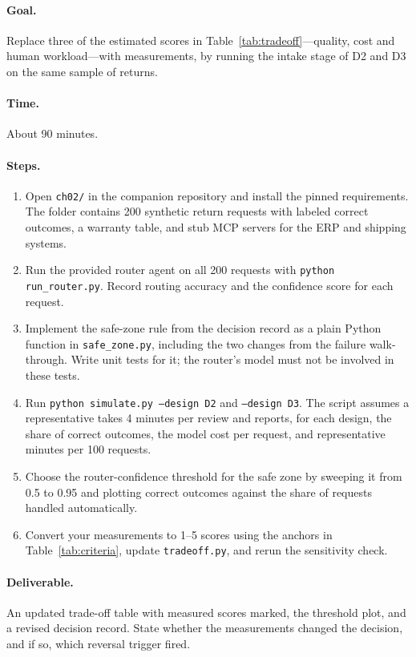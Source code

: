 \paragraph{Goal.} Replace three of the estimated scores in Table~\ref{tab:tradeoff}---quality, cost and human workload---with measurements, by running the intake stage of D2 and D3 on the same sample of returns.

\paragraph{Time.} About 90 minutes.

\paragraph{Steps.}
\begin{enumerate}[itemsep=2pt]
  \item Open \texttt{ch02/} in the companion repository and install the pinned requirements. The folder contains 200 synthetic return requests with labeled correct outcomes, a warranty table, and stub MCP servers for the ERP and shipping systems.
  \item Run the provided router agent on all 200 requests with \texttt{python run\_router.py}. Record routing accuracy and the confidence score for each request.
  \item Implement the safe-zone rule from the decision record as a plain Python function in \texttt{safe\_zone.py}, including the two changes from the failure walk-through. Write unit tests for it; the router's model must not be involved in these tests.
  \item Run \texttt{python simulate.py --design D2} and \texttt{--design D3}. The script assumes a representative takes 4 minutes per review and reports, for each design, the share of correct outcomes, the model cost per request, and representative minutes per 100 requests.
  \item Choose the router-confidence threshold for the safe zone by sweeping it from 0.5 to 0.95 and plotting correct outcomes against the share of requests handled automatically.
  \item Convert your measurements to 1--5 scores using the anchors in Table~\ref{tab:criteria}, update \texttt{tradeoff.py}, and rerun the sensitivity check.
\end{enumerate}

\paragraph{Deliverable.} An updated trade-off table with measured scores marked, the threshold plot, and a revised decision record. State whether the measurements changed the decision, and if so, which reversal trigger fired.

